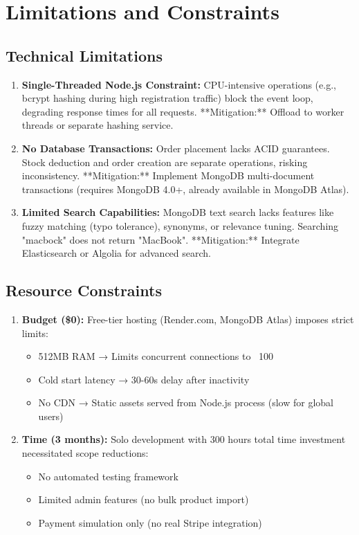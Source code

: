 \section{Limitations and Constraints}

\subsection{Technical Limitations}

\begin{enumerate}
    \item \textbf{Single-Threaded Node.js Constraint:} CPU-intensive operations (e.g., bcrypt hashing during high registration traffic) block the event loop, degrading response times for all requests. **Mitigation:** Offload to worker threads or separate hashing service.
    
    \item \textbf{No Database Transactions:} Order placement lacks ACID guarantees. Stock deduction and order creation are separate operations, risking inconsistency. **Mitigation:** Implement MongoDB multi-document transactions (requires MongoDB 4.0+, already available in MongoDB Atlas).
    
    \item \textbf{Limited Search Capabilities:} MongoDB text search lacks features like fuzzy matching (typo tolerance), synonyms, or relevance tuning. Searching "macbock" does not return "MacBook". **Mitigation:** Integrate Elasticsearch or Algolia for advanced search.
\end{enumerate}

\subsection{Resource Constraints}

\begin{enumerate}
    \item \textbf{Budget (\$0):} Free-tier hosting (Render.com, MongoDB Atlas) imposes strict limits:
    \begin{itemize}
        \item 512MB RAM → Limits concurrent connections to ~100
        \item Cold start latency → 30-60s delay after inactivity
        \item No CDN → Static assets served from Node.js process (slow for global users)
    \end{itemize}
    
    \item \textbf{Time (3 months):} Solo development with 300 hours total time investment necessitated scope reductions:
    \begin{itemize}
        \item No automated testing framework
        \item Limited admin features (no bulk product import)
        \item Payment simulation only (no real Stripe integration)
    \end{itemize}
\end{enumerate}


